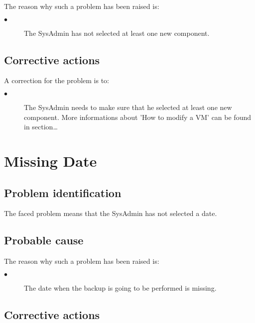 The reason why such a problem has been raised is:\\
\begin{description}
\item[$\bullet$] The SysAdmin has not selected at least one new component.
\end{description}


\subsection{Corrective actions}

A correction for the problem is to:\\
\begin{description}
\item[$\bullet$] The SysAdmin needs to make sure that he selected at least one
new component. More informations about 'How to modify a VM' can be found in
section\ldots

\end{description}









\section{Missing Date} 

\subsection{Problem identification}
The faced problem means that the SysAdmin has not selected a date.

\subsection{Probable cause}

The reason why such a problem has been raised is:\\
\begin{description}
\item[$\bullet$] The date when the backup is going to be performed is missing.
\end{description}


\subsection{Corrective actions}

